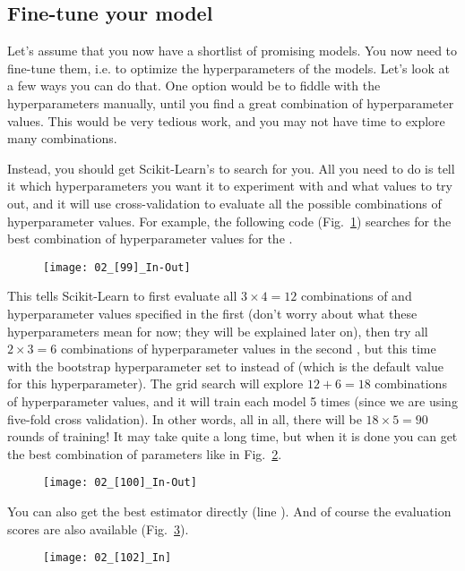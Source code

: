 \subsection{Fine-tune your model}
Let's assume that you now have a shortlist of promising models. You now need to fine-tune them, i.e. to optimize the hyperparameters of the models. Let's look at a few ways you can do that. One option would be to fiddle with the hyperparameters manually, until you find a great combination of hyperparameter values. This would be very tedious work, and you may not have time to explore many combinations.

Instead, you should get Scikit-Learn's  to search for you. All you need to do is tell it which hyperparameters you want it to experiment with and what values to try out, and it will use cross-validation to evaluate all the possible combinations of hyperparameter values. For example, the following code (Fig.~\ref{02_[99]_In-Out}) searches for the best combination of hyperparameter values for the .
\begin{figure}[h!t]
\centering
\texttt{[image: 02\_[99]\_In-Out]}
\caption{}\label{02_[99]_In-Out}
\end{figure}

This  tells Scikit-Learn to first evaluate all $3\times4=12$ combinations of  and  hyperparameter values specified in the first  (don't worry about what these hyperparameters mean for now; they will be explained later on), then try all $2\times3=6$ combinations of hyperparameter values in the second , but this time with the bootstrap hyperparameter set to  instead of  (which is the default value for this hyperparameter). The grid search will explore $12+6=18$ combinations of  hyperparameter values, and it will train each model 5 times (since we are using five-fold cross validation). In other words, all in all, there will be $18\times5=90$ rounds of training! It may take quite a long time, but when it is done you can get the best combination of parameters like in Fig.~\ref{02_[100]_In-Out}.
\begin{figure}[h!t]
\centering
\texttt{[image: 02\_[100]\_In-Out]}
\caption{}\label{02_[100]_In-Out}
\end{figure}

You can also get the best estimator directly (line ). And of course the evaluation scores are also available (Fig.~\ref{02_[102]_In}).
\begin{figure}[h!t]
\centering
\texttt{[image: 02\_[102]\_In]}
\caption{}\label{02_[102]_In}
\end{figure}

